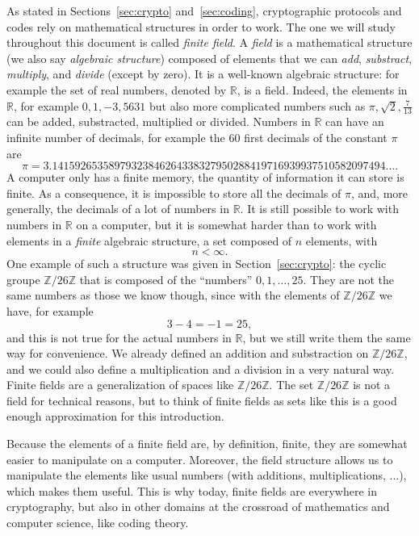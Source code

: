 As stated in Sections~\ref{sec:crypto} and~\ref{sec:coding}, cryptographic
protocols and codes rely on
mathematical structures in order to work. The one we will study throughout this
document is called \emph{finite field}. A \emph{field} is a mathematical
structure (we also say \emph{algebraic structure}) composed of elements that we
can \emph{add}, \emph{substract}, \emph{multiply}, and \emph{divide} (except by
zero). It is a well-known algebraic structure: for example the set of real
numbers, denoted by $\mathbb{R}$, is a field. Indeed, the elements in
$\mathbb{R}$, for example $0, 1, -3, 5631$ but also more complicated numbers
such as $\pi, \sqrt 2, \frac{7}{13}$ can be added, substracted, multiplied or
divided. Numbers in $\mathbb{R}$ can have an infinite number of decimals, for
example the $60$ first decimals of the constant $\pi$ are
\[
  \pi = 3.14159265358979323846264338327950288419716939937510582097494\dots.
\]
A computer only has a finite memory, \ie the quantity of information it can
store is finite. As a consequence, it is impossible to store all the decimals of
$\pi$, and, more generally, the decimals of a lot of numbers in $\mathbb{R}$. It
is still possible to work with numbers in $\mathbb{R}$ on a computer, but it is
somewhat harder than to work with elements in a \emph{finite} algebraic
structure, \ie a set composed of $n$ elements, with
\[
  n < \infty.
\]
One example of such a structure was given in Section~\ref{sec:crypto}: the
cyclic groupe $\mathbb{Z}/26\mathbb{Z}$ that is composed of the ``numbers'' $0,
1, \dots, 25$. They are not the same numbers as those we know though, since with
the elements of $\mathbb{Z}/26\mathbb{Z}$ we have, for example
\[
  3 - 4 = -1 = 25,
\]
and this is not true for the actual numbers in $\mathbb{R}$, but we still write
them the same way for convenience. We already defined an
addition and substraction on $\mathbb{Z}/26\mathbb{Z}$, and we could also define
a multiplication and a division in a very natural way. Finite fields are a
generalization of spaces like
$\mathbb{Z}/26\mathbb{Z}$. The set $\mathbb{Z}/26\mathbb{Z}$ is not a field for
technical reasons, but to think of finite fields as sets like this is a good
enough approximation for this introduction.

Because the elements of a finite field are, by definition, finite, they are
somewhat easier to manipulate on a computer. Moreover, the field structure
allows us to manipulate the elements like usual numbers (\ie with additions,
multiplications, ...), which makes them useful. This is why today, finite fields
are everywhere in cryptography, but also in other domains at the crossroad of
mathematics and computer science, like coding theory.

